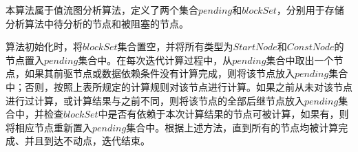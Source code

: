 %

本算法属于值流图分析算法，定义了两个集合$ pending $和$ blockSet $，分别用于存储分析算法中待分析的节点和被阻塞的节点。

算法初始化时，将$ blockSet $集合置空，并将所有类型为$ StartNode $和$ ConstNode $的节点置入$ pending $集合中。在每次迭代计算过程中，从$ pending $集合中取出一个节点，如果其前驱节点或数据依赖条件没有计算完成，则将该节点放入$ pending $集合中；否则，按照上表所规定的计算规则对该节点进行计算。如果之前从未对该节点进行过计算，或计算结果与之前不同，则将该节点的全部后继节点放入$ pending $集合中，并检查$ blockSet $中是否有依赖于本次计算结果的节点可被计算，如果有，则将相应节点重新置入$ pending $集合中。根据上述方法，直到所有的节点均被计算完成、并且到达不动点，迭代结束。

